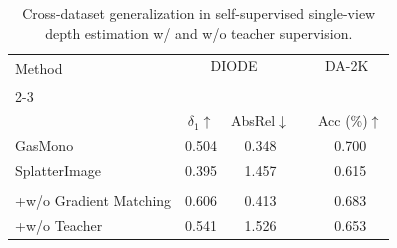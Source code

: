 \begin{table}[ht!]
    \begin{center}
\footnotesize
    \setlength{\tabcolsep}{2.0pt} %
    \begin{tabular}{@{}lccc c@{}}
    \toprule
    \multirow{2}{*}[-2pt]{Method} & \multicolumn{2}{c}{DIODE~\scriptsize{\citep{vasiljevic2019diode}}}& & DA-2K~\scriptsize{\citep{yang2024depth}} \\
    \addlinespace[-12pt] \\
    \cmidrule{2-3} \cmidrule{5-5} 
    \addlinespace[-12pt] \\
    & $\delta_1$$\uparrow$ & AbsRel$\downarrow$ & & Acc (\%)$\uparrow$ \\
    \midrule
    
    GasMono~\scriptsize{\citep{zhao2023gasmono}}  & {0.504} & {0.348} && {0.700} \\{SplatterImage}~\scriptsize{\citep{szymanowicz2024splatter}} & 0.395 & 1.457 && 0.615  \\
    \midrule
    \cellcolor{Gray}{Final} & \cellcolor{Gray}{0.604} & \cellcolor{Gray}{0.407} &\cellcolor{Gray}& \cellcolor{Gray}{0.708} \\
    {+w/o Gradient Matching} & {0.606} & {0.413} && {0.683} \\
    {+w/o Teacher} & {0.541} & {1.526} && {0.653} \\
    \bottomrule
    \end{tabular}
    \end{center}
    \caption{Cross-dataset generalization in self-supervised single-view depth estimation w/ and w/o teacher supervision.
    }
    \label{tab:mono_depth_teacher_sup_ablation}
    \vspace{-0.4cm}
\end{table}